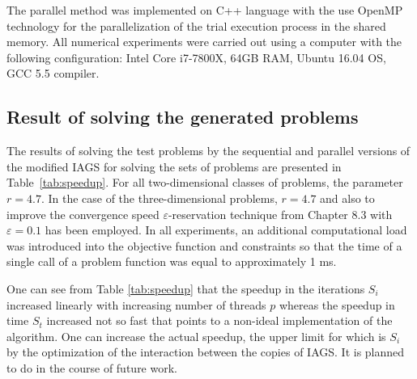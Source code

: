 \documentclass[runningheads]{llncs}
\begin{document}
The parallel method was implemented on C++ language with the use OpenMP technology for
the parallelization of the trial execution process in the shared memory.
All numerical experiments were carried out using a computer with the following  configuration:
Intel Core i7-7800X, 64GB RAM, Ubuntu 16.04 OS, GCC 5.5 compiler.

\subsection{Result of solving the generated problems}

The results of solving the test problems by the sequential and parallel versions of the modified
IAGS for solving the sets of problems are presented in Table~\ref{tab:speedup}.
For all two-dimensional classes of problems, the parameter \(r=4.7\).
In the case of the three-dimensional problems, \(r=4.7\) and also to improve the convergence speed
\(\varepsilon\)-reservation technique from \cite{Strongin2000} Chapter 8.3 with
\(\varepsilon=0.1\) has been employed.
In all experiments, an additional computational load was introduced into the objective function
and constraints so that the time of a single call of a problem function was equal to
approximately 1 ms.

One can see from Table \ref{tab:speedup} that the speedup in the iterations \(S_i\) increased
linearly with increasing number of threads \(p\) whereas the speedup in time \(S_t\) increased
not so fast that points to a non-ideal implementation of the algorithm.
One can increase the actual speedup, the upper limit for which is \(S_i\) by the optimization of
the interaction between the copies of IAGS. It is planned to do in the course of future work.
\end{document}
